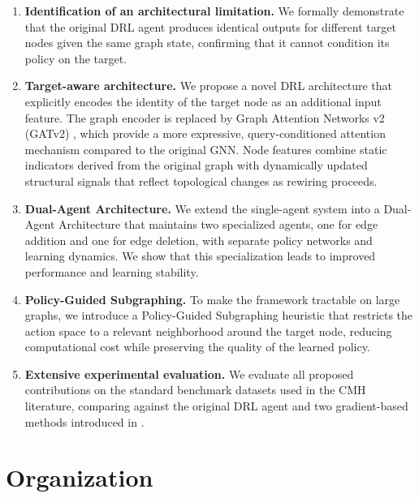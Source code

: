 \documentclass[11pt,a4paper,twoside]{tesis}
\begin{document}
\begin{enumerate}
    \item \textbf{Identification of an architectural limitation.}
          We formally demonstrate that the original DRL agent produces identical outputs
          for different target nodes given the same graph state, confirming that it cannot
          condition its policy on the target.

    \item \textbf{Target-aware architecture.}
          We propose a novel DRL architecture that explicitly encodes the identity of the
          target node as an additional input feature. The graph encoder is replaced by
          Graph Attention Networks v2 (GATv2) \cite{brody2022how}, which provide a more
          expressive, query-conditioned attention mechanism compared to the original GNN.
          Node features combine static indicators derived from the original graph with
          dynamically updated structural signals that reflect topological changes as
          rewiring proceeds.

    \item \textbf{Dual-Agent Architecture.}
          We extend the single-agent system into a Dual-Agent Architecture that maintains
          two specialized agents, one for edge addition and one for edge deletion, with
          separate policy networks and learning dynamics. We show that this specialization
          leads to improved performance and learning stability.

    \item \textbf{Policy-Guided Subgraphing.}
          To make the framework tractable on large graphs, we introduce a
          Policy-Guided Subgraphing heuristic that restricts the action space to a
          relevant neighborhood around the target node, reducing computational cost while
          preserving the quality of the learned policy.

    \item \textbf{Extensive experimental evaluation.}
          We evaluate all proposed contributions on the standard benchmark datasets used
          in the CMH literature, comparing against the original DRL agent and two
          gradient-based methods introduced in
          \textcite{silvestri2025righthidemaskingcommunity}.
\end{enumerate}

\section*{Organization}
\end{document}
